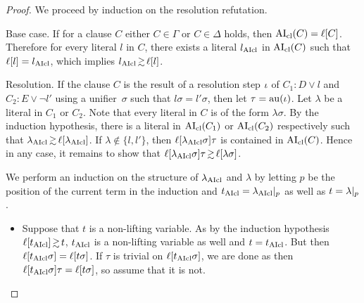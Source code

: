 \documentclass[,%
	draft=false,%
	numbers=noendperiod
	11pt,
	a4paper,
	oneside,%
	openany,
]{memoir}
\begin{document}
\begin{proof}
	We proceed by induction on the resolution refutation.
	\begin{description}
		\item{Base case.}
			If for a clause $C$ either $C\in \Gamma$ or $C \in \Delta$ holds, then $\operatorname{AI}_\mathrm{cl}(C) = \ell[C]$.
			Therefore for every literal $l$ in $C$, there exists a literal $l_{\operatorname{AIcl}}$ in $\operatorname{AI}_\mathrm{cl}(C)$ such that $\ell[l] = l_{\operatorname{AIcl}}$, which implies $l\cl \simgeq \lifboth{l}$.

		\item{Resolution.}
			If the clause $C$ is the result of a resolution step $\iota$ of $C_1: D \lor l$ and $C_2: E \lor \lnot l'$ using a unifier~$\sigma$ such that $l\sigma = l'\sigma$,
			then let $\tau = \operatorname{au}(\iota)$.
			Let $\lambda$ be a literal in $C_1$ or $C_2$. 
			Note that every literal in $C$ is of the form $\lambda\sigma$.
			By the induction hypothesis, there is a literal in $\operatorname{AI}_\mathrm{cl}(C_1)$ or $\operatorname{AI}_\mathrm{cl}(C_2)$ respectively such that $\lambda\cl \simgeq \lifboth{\lambda\cl}$.
			If $\lambda \not\in\{l,l'\}$, then $\ell[\lambda_{\operatorname{AIcl}}\sigma]\tau$ is contained in $\operatorname{AI}_\mathrm{cl}(C)$.
			Hence in any case, it remains to show that $\lifboth{\lambda\cl\sigma}\tau \simgeq \lifboth{\lambda\sigma}$. 




			We perform an induction on the structure of $\lambda_{\operatorname{AIcl}}$ and $\lambda$ 
			by letting $p$ be the position of the current term in the induction and $t_{\operatorname{AIcl}} = \lambda_{\operatorname{AIcl}}|_{p}$ as well as $t=\lambda|_{p}$.
			\begin{itemize}
				\item
					Suppose that $t$ is a non-lifting variable.
					As by the induction hypothesis $\lifboth{t\cl} \simgeq t$, $t_{\operatorname{AIcl}}$ is a non-lifting variable as well and $t = t_{\operatorname{AIcl}}$.
					But then $\ell[t_{\operatorname{AIcl}}\sigma] = \ell[t\sigma]$.
					If $\tau$ is trivial on $\ell[t_{\operatorname{AIcl}}\sigma]$, we are done as then $\ell[t_{\operatorname{AIcl}}\sigma]\tau = \ell[t\sigma]$, so assume that it is not.


\end{itemize}
\end{description}
\end{proof}
\end{document}
